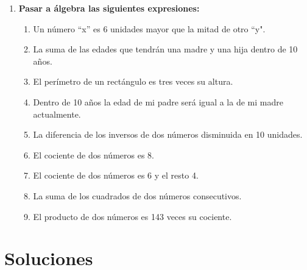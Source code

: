 \documentclass[a4paper,12pt]{article}
\begin{document}
\begin{enumerate}
    \item \textbf{Pasar a álgebra las siguientes expresiones:}
        \begin{enumerate}[label=\textbf{\alph*)}]
            \item Un número “x” es 6 unidades mayor que la mitad de otro “y".
            \item La suma de las edades que tendrán una madre y una hija dentro de 10 años.
            \item El perímetro de un rectángulo es tres veces su altura.
            \item Dentro de 10 años la edad de mi padre será igual a la de mi madre actualmente.
            \item La diferencia de los inversos de dos números disminuida en 10 unidades.
            \item El cociente de dos números es 8.
            \item El cociente de dos números es 6 y el resto 4.
            \item La suma de los cuadrados de dos números consecutivos.
            \item El producto de dos números es 143 veces su cociente.
        \end{enumerate}
\end{enumerate}

\newpage
\section*{Soluciones}
\end{document}

